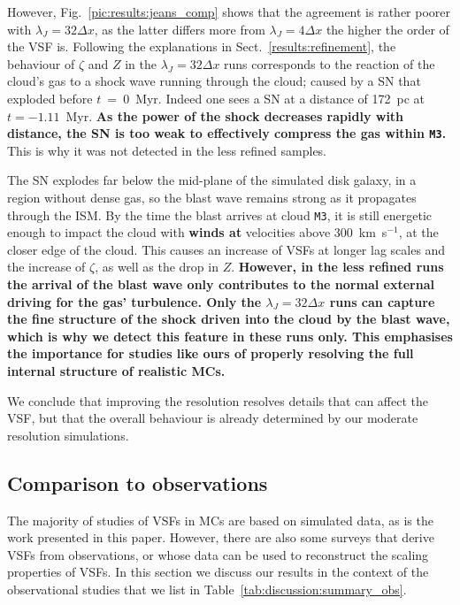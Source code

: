 However, Fig.~\ref{pic:results:jeans_comp} shows that the agreement is rather poorer with $\lambda_J=32\Delta{}x$, as the latter differs more from $\lambda_J=4\Delta{}x$ the higher the order of the VSF is.
Following the explanations in Sect.~\ref{results:refinement}, the behaviour of $\zeta$ and $Z$ in the $\lambda_J=32\Delta{}x$ runs corresponds to the reaction of the cloud's gas to a shock wave running through the cloud; caused by a SN that exploded before $t$~=~0~Myr. 
Indeed one sees a SN at a distance of 172~pc at $t=-1.11$~Myr. 
\textbf{
As the power of the shock decreases rapidly with distance, the SN is too weak to effectively compress the gas within \texttt{M3}.
}
This is why it was not detected in the less refined samples.

The SN explodes far below the mid-plane of the simulated disk galaxy, in a region without dense gas, so the blast wave remains strong as it propagates through the ISM. 
By the time the blast arrives at cloud \texttt{M3}, it is still energetic enough to impact the cloud with \textbf{winds at} velocities above 300~km~s$^{-1}$, at the closer edge of the cloud. 
This causes an increase of VSFs at longer lag scales and the increase of $\zeta$, as well as the drop in $Z$.
\textbf{
However, in the less refined runs the arrival of the blast wave only contributes to the normal external driving for the gas' turbulence.
Only the $\lambda_J=32\Delta{}x$ runs can capture the fine structure of the shock driven into the cloud by the blast wave, which is why we detect this feature in these runs only. 
This emphasises the importance for studies like ours of properly resolving the full internal structure of realistic MCs.
}

We conclude that improving the resolution resolves details that can affect the VSF, but that the overall behaviour is already determined by our moderate resolution simulations.

\subsection{Comparison to observations}\label{discussion:observation}

The majority of studies of VSFs in MCs are based on simulated data, as is the work presented in this paper.
However, there are also some surveys that derive VSFs from observations, or whose data can be used to reconstruct the scaling properties of VSFs. 
In this section we discuss our results in the context of the observational studies that we list in Table~\ref{tab:discussion:summary_obs}.

